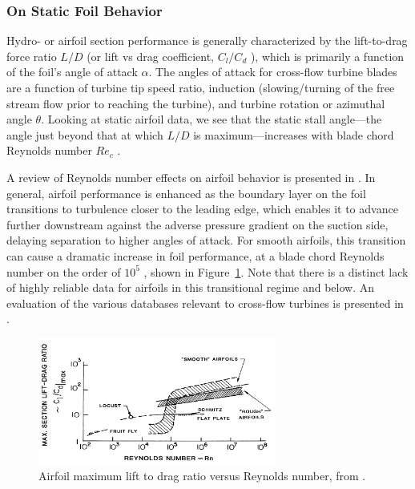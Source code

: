 \documentclass[energies,article,accept,moreauthors,pdftex,12pt,a4paper]{mdpi}
\begin{document}
\subsubsection{On Static Foil Behavior}

Hydro- or airfoil section performance is generally characterized by the
lift-to-drag force ratio $L/D$  (or lift vs drag coefficient, $C_l/C_d$ ), which
is primarily a function of the foil's angle of attack $\alpha$. The angles of
attack for cross-flow turbine blades are a function of turbine tip speed ratio,
induction (slowing/turning of the free stream flow prior to reaching the
turbine), and turbine rotation or azimuthal angle $\theta$. Looking at static
airfoil data, we see that the static stall angle---the angle just beyond that at
which $L/D$ is maximum---increases with blade chord Reynolds number $Re_c$
\cite{Jacobs1937}.

A review of Reynolds number effects on airfoil behavior is presented in
\cite{Lissaman1983}. In general, airfoil performance is enhanced as the boundary
layer on the foil transitions to turbulence closer to the leading edge, which
enables it to advance further downstream against the adverse pressure gradient
on the suction side, delaying separation to higher angles of attack. For smooth
airfoils, this transition can cause a dramatic increase in foil performance, at
a blade chord Reynolds number on the order of $10^5$ \cite{McMasters1980}, shown
in Figure~\ref{fig:McMasters}. Note that there is a distinct lack of highly
reliable data for airfoils in this transitional regime and below. An evaluation
of the various databases relevant to cross-flow turbines is presented in
\cite{Bedon2014}.


\begin{figure}[ht]
\centering

\includegraphics[width=0.7\textwidth]{figures/McMasters-Henderson-1980}

\caption{Airfoil maximum lift to drag ratio versus Reynolds number, from
    \cite{McMasters1980}.}

\label{fig:McMasters}
\end{figure}
\end{document}
